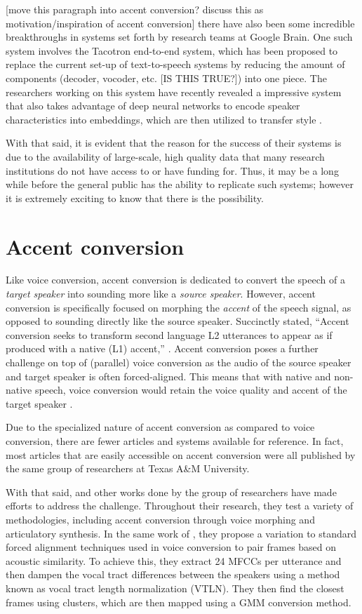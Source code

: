 \documentclass
[
    a4paper,
    twoside,
    12pt
]
{report}
\begin{document}
{[}move this paragraph into accent conversion? discuss this as
motivation/inspiration of accent conversion{]} there have also been some
incredible breakthroughs in systems set forth by research teams at
Google Brain. One such system involves the Tacotron end-to-end system,
which has been proposed to replace the current set-up of text-to-speech
systems by reducing the amount of components (decoder, vocoder, etc.
{[}IS THIS TRUE?{]}) into one piece. The researchers working on this
system have recently revealed a impressive system that also takes
advantage of deep neural networks to encode speaker characteristics into
embeddings, which are then utilized to transfer style
\parencite{wang2018}.

With that said, it is evident that the reason for the success of their
systems is due to the availability of large-scale, high quality data
that many research institutions do not have access to or have funding
for. Thus, it may be a long while before the general public has the
ability to replicate such systems; however it is extremely exciting to
know that there is the possibility.

\section{Accent conversion}\label{accent-conversion}

Like voice conversion, accent conversion is dedicated to convert the
speech of a \emph{target speaker} into sounding more like a \emph{source
speaker}. However, accent conversion is specifically focused on morphing
the \emph{accent} of the speech signal, as opposed to sounding directly
like the source speaker. Succinctly stated, ``Accent conversion seeks to
transform second language L2 utterances to appear as if produced with a
native (L1) accent,'' \parencite{aryal2014a}. Accent conversion poses a
further challenge on top of (parallel) voice conversion as the audio of
the source speaker and target speaker is often forced-aligned. This
means that with native and non-native speech, voice conversion would
retain the voice quality and accent of the target speaker
\parencite{aryal2014}.

Due to the specialized nature of accent conversion as compared to voice
conversion, there are fewer articles and systems available for
reference. In fact, most articles that are easily accessible on accent
conversion were all published by the same group of researchers at Texas
A\&M University.

With that said, \textcite{aryal2014} and other works done by the group
of researchers have made efforts to address the challenge. Throughout
their research, they test a variety of methodologies, including accent
conversion through voice morphing and articulatory synthesis. In the
same work of \textcite{aryal2014}, they propose a variation to standard
forced alignment techniques used in voice conversion to pair frames
based on acoustic similarity. To achieve this, they extract 24 MFCCs per
utterance and then dampen the vocal tract differences between the
speakers using a method known as vocal tract length normalization
(VTLN). They then find the closest frames using clusters, which are then
mapped using a GMM conversion method.
\end{document}
